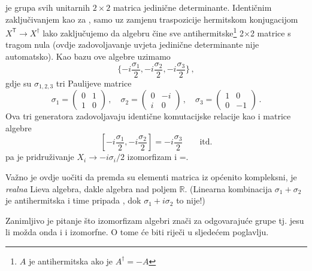 \begin{primjer} \label{pr:su2so3Alg}
     je grupa svih unitarnih $2\times 2$ matrica jedinične determinante.
    Identičnim zaključivanjem kao za , samo uz zamjenu traspozicije
    hermitskom konjugacijom $X^\mathsf{T} \to X^\mathsf{\dagger}$ lako
    zaključujemo da algebru  čine sve
    antihermitske\footnote{$A$ je antihermitska ako je $A^\dagger=-A$} 
    2$\times$2 matrice s tragom nula (ovdje zadovoljavanje uvjeta jedinične
    determinante nije automatsko). Kao bazu ove algebre uzimamo
\begin{equation}
     \{ -i\frac{\sigma_1}{2},  -i\frac{\sigma_2}{2},  -i\frac{\sigma_3}{2} \} \,,
\end{equation}
gdje su $\sigma_{1,2,3}$ tri Paulijeve matrice
\begin{equation}
\sigma_1=\left( \begin{array}{cc} 0 &  1 \\ 1 & 0 \end{array} \right) \,,
\quad
\sigma_2=\left( \begin{array}{cc} 0 & -i \\ i & 0 \end{array} \right) \,,
\quad
\sigma_3=\left( \begin{array}{cc} 1 &  0 \\ 0 &-1 \end{array} \right) \,.
\label{eq:PaulijeveMatrice}
\end{equation}
Ova tri generatora zadovoljavaju identične komutacijske relacije kao i matrice
 algebre
\begin{displaymath}
 \left[ -i\frac{\sigma_1}{2}, -i\frac{\sigma_2}{2} \right] =
 -i\frac{\sigma_3}{2} \qquad \text{itd.}
\end{displaymath}
pa je pridruživanje $X_i \to -i \sigma_i/2$  izomorfizam i
=.

Važno je ovdje uočiti da premda su elementi matrica iz  općenito kompleksni,
 je \emph{realna} Lieva algebra, dakle algebra nad poljem $\mathbb{R}$. 
(Linearna kombinacija $\sigma_1 + \sigma_2$ je antihermitska i time pripada ,
dok $\sigma_1 + i \sigma_2$ to nije!)

Zanimljivo je pitanje što izomorfizam algebri znači za odgovarajuće grupe tj.
jesu li možda onda i  i  izomorfne. O tome će biti riječi u sljedećem poglavlju.
\end{primjer}

